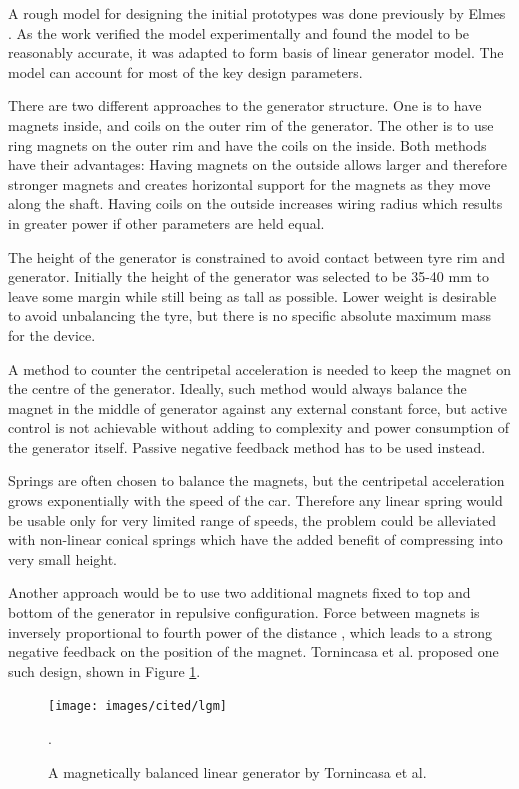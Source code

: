 A rough model for designing the initial prototypes was done previously by Elmes \cite{Elmes2005}. As the work verified the model experimentally and found the model to be reasonably accurate, it was adapted to form basis of linear generator model. The model can account for most of the key design parameters. 

There are two different approaches to the generator structure. One is to have magnets inside, and coils on the outer rim of the generator. The other is to use ring magnets on the outer rim and have the coils on the inside. Both methods have their advantages: Having magnets on the outside allows larger and therefore stronger magnets and creates horizontal support for the magnets as they move along the shaft. Having coils on the outside increases wiring radius which results in greater power if other parameters are held equal. 

The height of the generator is constrained to avoid contact between tyre rim and generator. Initially the height of the generator was selected to be 35-40 mm to leave some margin while still being as tall as possible. Lower weight is desirable to avoid unbalancing the tyre, but there is no specific absolute maximum mass for the device. 

A method to counter the centripetal acceleration is needed to keep the magnet on the centre of the generator. Ideally, such method would always balance the magnet in the middle of generator against any external constant force, but active control is not achievable without adding to complexity and power consumption of the generator itself. Passive negative feedback method has to be used instead. 

Springs are often chosen to balance the magnets, but the centripetal acceleration grows exponentially with the speed of the car. Therefore any linear spring would be usable only for very limited range of speeds, the problem could be alleviated with non-linear conical springs which have the added benefit of compressing into very small height.

Another approach would be to use two additional magnets fixed to top and bottom of the generator in repulsive configuration. Force between magnets is inversely proportional to fourth power of the distance \cite{Amrani2015}, which leads to a strong negative feedback on the position of the magnet. Tornincasa et al. \cite{Tornincasa2012} proposed one such design, shown in Figure \ref{lgm}.

\begin{figure}[htb]
\begin{center}
\texttt{[image: images/cited/lgm]}
\end{center}
\caption{A magnetically balanced linear generator by Tornincasa et al. \cite{Tornincasa2012}}.
\label{lgm}
\end{figure}


